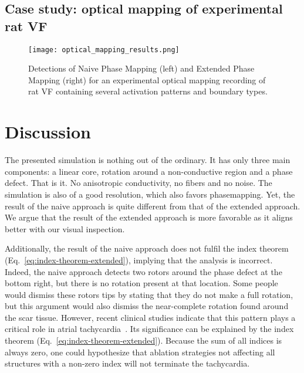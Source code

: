\documentclass[twocolumn]{article}
\begin{document}
\subsection{Case study: optical mapping of experimental rat VF}

\begin{figure}[ht]
  \centering
  \texttt{[image: optical\_mapping\_results.png]}
  \caption{Detections of Naive Phase Mapping (left) and Extended Phase Mapping (right) for an experimental optical mapping recording of rat VF containing several activation patterns and boundary types.}
  \label{fig:optical_mapping_results}
\end{figure}

\section{Discussion}


The presented simulation is nothing out of the ordinary.
It has only three main components:
a linear core, rotation around a non-conductive region and a phase defect.
That is it. No anisotropic conductivity, no fibers and no noise.
The simulation is also of a good resolution, which also favors phasemapping.
Yet, the result of the naive approach is quite different
from that of the extended approach.
We argue that the result of the extended approach is more favorable
as it aligns better with our visual inspection.

Additionally, the result of the naive approach does not fulfil the index theorem (Eq.~\ref{eq:index-theorem-extended}),
implying that the analysis is incorrect.
Indeed, the naive approach detects two rotors around the phase defect at the bottom right,
but there is no rotation present at that location.
Some people would dismiss these rotors tips
by stating that they do not make a full rotation,
but this argument would also dismiss the near-complete rotation
found around the scar tissue.
However, recent clinical studies indicate
that this pattern plays a critical role in atrial tachycardia~\autocite{duytschaever2024atrial, santucci2024identification, takigawa2019a}.
Its significance can be explained by the index theorem (Eq.~\ref{eq:index-theorem-extended}).
Because the sum of all indices is always zero,
one could hypothesize that ablation strategies
not affecting all structures with a non-zero index will not terminate the tachycardia.
\end{document}
